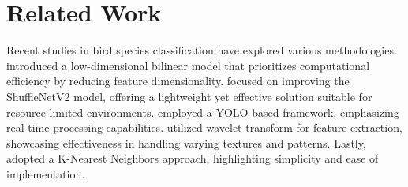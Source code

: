 \section{Related Work}
Recent studies in bird species classification have explored various methodologies. \citet{haobin_fine-grained_2018} introduced a low-dimensional bilinear model that prioritizes computational efficiency by reducing feature dimensionality. \citet{zhang_improvements_2023} focused on improving the ShuffleNetV2 model, offering a lightweight yet effective solution suitable for resource-limited environments. \citet{vo_bird_2023} employed a YOLO-based framework, emphasizing real-time processing capabilities. \citet{zahra_el_bouni_bird_2021} utilized wavelet transform for feature extraction, showcasing effectiveness in handling varying textures and patterns. Lastly, \citet{budiman_classification_2022} adopted a K-Nearest Neighbors approach, highlighting simplicity and ease of implementation. 